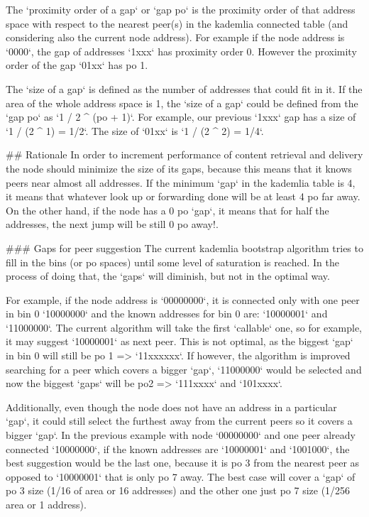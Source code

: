 The `proximity order of a gap` or `gap po` is the proximity order of that address space with respect to the nearest peer(s)
in the kademlia connected table (and considering also the current node address). For example if the node address is `0000`, 
the gap of addresses `1xxx` has proximity order 0. However the proximity order of the gap `01xx` has po 1.
  
The `size of a gap` is defined as the number of addresses that could fit in it. If the area of the whole address space is 1,
the `size of a gap` could be defined from the `gap po` as `1 / 2 ^ (po + 1)`. For example, our previous `1xxx` gap has a size of
`1 / (2 ^ 1) = 1/2`. The size of `01xx` is `1 / (2 ^ 2) = 1/4`. 

## Rationale
In order to increment performance of content retrieval and delivery the node should minimize the size of its gaps, because this 
means that it knows peers near almost all addresses. If the minimum `gap` in the kademlia table is 4, it means that whatever 
look up or forwarding done will be at least 4 po far away. On the other hand, if the node has a 0 po `gap`, it means that
for half the addresses, the next jump will be still 0 po away!.


### Gaps for peer suggestion
The current kademlia bootstrap algorithm tries to fill in the bins (or po spaces) until some level of saturation is reached.
In the process of doing that, the `gaps` will diminish, but not in the optimal way.

For example, if the node address is `00000000`, it is connected only with one peer in bin 0 `10000000` and the known 
addresses for bin 0 are: `10000001` and `11000000`. The current algorithm will take the first `callable` one, so 
for example, it may suggest `10000001` as next peer. This is not optimal, as the biggest `gap` in bin 0 will still be 
po 1 => `11xxxxxx`. If however, the algorithm is improved searching for a peer which covers a bigger `gap`, `11000000` would
be selected and now the biggest `gaps` will be po2 => `111xxxx` and `101xxxx`.

Additionally, even though the node does not have an address in a particular `gap`, it could still select the furthest away 
from the current peers so it covers a bigger `gap`. In the previous example with node `00000000` and one peer already connected
`10000000`, if the known addresses are `10000001` and `1001000`, the best suggestion would be the last one, because it is po 3
from the nearest peer as opposed to `10000001` that is only po 7 away. The best case will cover a `gap` of po 3 size 
(1/16 of area or 16 addresses) and the other one just po 7 size (1/256 area or 1 address).

